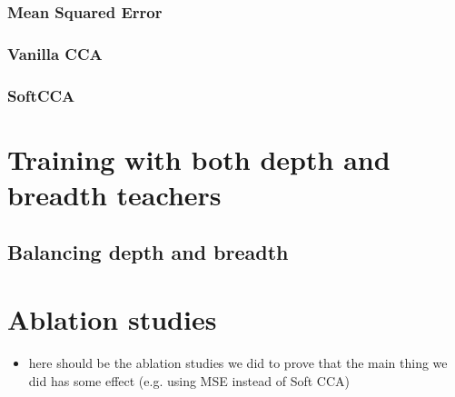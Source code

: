 \subsubsection{Mean Squared Error}
\subsubsection{Vanilla CCA}
\subsubsection{SoftCCA}

\section{Training with both depth and breadth teachers}
\subsection{Balancing depth and breadth}


\section{Ablation studies}

\begin{itemize}
    \item here should be the ablation studies we did to prove that the main
        thing we did has some effect (e.g. using MSE instead of Soft CCA)
\end{itemize}

